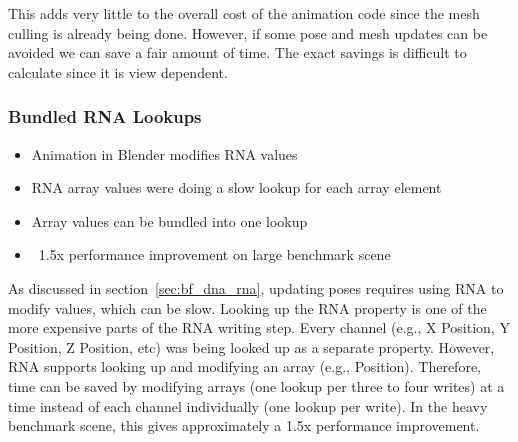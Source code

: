 
This adds very little to the overall cost of the animation code since the mesh culling is already being done. However, if some pose and mesh updates can be avoided we can save a fair amount of time. The exact savings is difficult to calculate since it is view dependent. 

\subsubsection{Bundled RNA Lookups}
\begin{itemize}
 \item Animation in Blender modifies RNA values
 \item RNA array values were doing a slow lookup for each array element
 \item Array values can be bundled into one lookup
 \item ~1.5x performance improvement on large benchmark scene
\end{itemize}

As discussed in section~\ref{sec:bf_dna_rna}, updating poses requires using RNA to modify values, which can be slow. Looking up the RNA property is one of the more expensive parts of the RNA writing step. Every channel (e.g., X Position, Y Position, Z Position, etc) was being looked up as a separate property. However, RNA supports looking up and modifying an array (e.g., Position). Therefore, time can be saved by modifying arrays (one lookup per three to four writes) at a time instead of each channel individually (one lookup per write). In the heavy benchmark scene, this gives approximately a 1.5x performance improvement.

